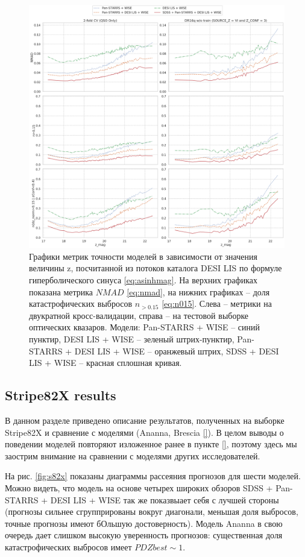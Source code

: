\documentclass[fleqn,usenatbib]{mnras}
\begin{document}
\begin{figure}[ht]
    \centering
    \includegraphics[width=0.9\linewidth]{images/metrics_z-mag.png}
    \caption{Графики метрик точности моделей в зависимости от значения величины z, посчитанной из потоков каталога DESI LIS по формуле гиперболического синуса \eqref{eq:asinhmag}. На верхних графиках показана метрика $NMAD$ \eqref{eq:nmad}, на нижних графиках -- доля катастрофических выбросов $n_{>0.15}$ \eqref{eq:n015}. Слева -- метрики на двукратной кросс-валидации, справа -- на тестовой выборке оптических квазаров. Модели: Pan-STARRS + WISE -- синий пунктир, DESI LIS + WISE -- зеленый штрих-пунктир, Pan-STARRS + DESI LIS + WISE -- оранжевый штрих, SDSS + DESI LIS + WISE -- красная сплошная кривая.}
    \label{fig:metrics_z_mag}
\end{figure}

\subsection{Stripe82X results}\label{subsec:s82x_results}

В данном разделе приведено описание результатов, полученных на выборке Stripe82X и сравнение с моделями (Ananna, Brescia \ref{}). В целом выводы о поведении моделей повторяют изложенное ранее в пункте \ref{}, поэтому здесь мы заострим внимание на сравнении с моделями других исследователей.

На рис. \ref{fig:s82x} показаны диаграммы рассеяния прогнозов для шести моделей. Можно видеть, что модель на основе четырех широких обзоров SDSS + Pan-STARRS + DESI LIS + WISE так же показвыает себя с лучшей стороны (прогнозы сильнее сгруппрированы вокруг диагонали, меньшая доля выбросов, точные прогнозы имеют бОльшую достоверность). Модель Ananna в свою очередь дает слишком высокую уверенность прогнозов: существенная доля катастрофических выбросов имеет $PDZbest \sim 1$.
\end{document}
